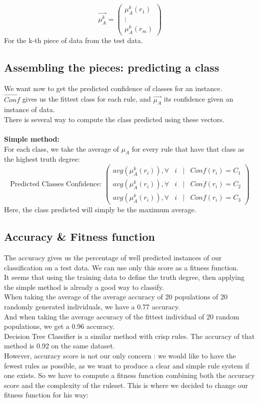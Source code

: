 \documentclass[a4paper,12pt]{article}
\begin{document}
\[
\vec{\mu_A^k}=
\begin{pmatrix}
\mu_A^k(r_1)\\
\vdots\\
\mu_A^k(r_m)
\end{pmatrix}
\]
For the k-th piece of data from the test data.

\subsection{Assembling the pieces: predicting a class}

We want now to get the predicted confidence of classes for an instance.\\
$\vec{Conf}$ gives us the fittest class for each rule, and $\vec{\mu_A}$ its confidence given an instance of data. \\
There is several way to compute the class predicted using these vectors.
\\
\\
\textbf{Simple method:}
\\
For each class, we take the average of $\mu_A$ for every rule that have that class as the highest truth degree:
\[
\text{Predicted Classes Confidence: }
\begin{pmatrix}
avg(\mu_A^k(r_i)), \forall & i & | & Conf(r_i)=C_1\\
avg(\mu_A^k(r_i)), \forall & i & | & Conf(r_i)=C_2\\
avg(\mu_A^k(r_i)), \forall & i & | & Conf(r_i)=C_3
\end{pmatrix}
\]
Here, the class predicted will simply be the maximum average.


\subsection{Accuracy \& Fitness function}

The accuracy gives us the percentage of well predicted instances of our classification on a test data. We can use only this score as a fitness function.\\
It seems that using the training data to define the truth degree, then applying the simple method is already a good way to classify.\\
When taking the average of the average accuracy of 20 populations of 20 randomly generated individuals, we have a 0.77 accuracy.\\
And when taking the average accuracy of the fittest individual of 20 random populations, we get a 0.96 accuracy.\\
Decision Tree Classifier is a similar method with crisp rules. The accuracy of that method is 0.92 on the same dataset.\\
However, accuracy score is not our only concern : we would like to have the fewest rules as possible, as we want to produce a clear and simple rule system if one exists. So we have to compute a fitness function combining both the accuracy score and the complexity of the ruleset.
This is where we decided to change our fitness function for his way:
\end{document}
